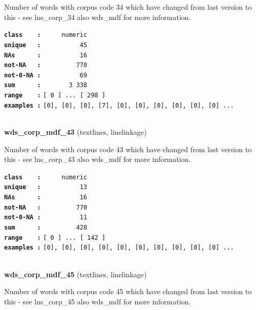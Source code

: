 \documentclass[]{article}
\begin{document}
Number of words with corpus code 34 which have changed from last version
to this - see lns\_corp\_34 also wds\_mdf for more information.

\textbf{\texttt{class\ \ \ \ :}} \texttt{~~~~~numeric}\\
\textbf{\texttt{unique\ \ \ :}} \texttt{~~~~~~~~~~45}\\
\textbf{\texttt{NAs\ \ \ \ \ \ :}} \texttt{~~~~~~~~~~16}\\
\textbf{\texttt{not-NA\ \ \ :}} \texttt{~~~~~~~~~770}\\
\textbf{\texttt{not-0-NA\ :}} \texttt{~~~~~~~~~~69}\\
\textbf{\texttt{sum\ \ \ \ \ \ :}} \texttt{~~~~~~~3~338}\\
\textbf{\texttt{range\ \ \ \ :}}
\texttt{{[}\ 0\ {]}\ ...\ {[}\ 298\ {]}}\\
\textbf{\texttt{examples\ :}}
\texttt{{[}0{]},\ {[}0{]},\ {[}0{]},\ {[}7{]},\ {[}0{]},\ {[}0{]},\ {[}0{]},\ {[}0{]},\ {[}0{]},\ {[}0{]}\ ...}\\

~

\textbf{wds\_corp\_mdf\_43} (textlines, linelinkage)

Number of words with corpus code 43 which have changed from last version
to this - see lns\_corp\_43 also wds\_mdf for more information.

\textbf{\texttt{class\ \ \ \ :}} \texttt{~~~~~numeric}\\
\textbf{\texttt{unique\ \ \ :}} \texttt{~~~~~~~~~~13}\\
\textbf{\texttt{NAs\ \ \ \ \ \ :}} \texttt{~~~~~~~~~~16}\\
\textbf{\texttt{not-NA\ \ \ :}} \texttt{~~~~~~~~~770}\\
\textbf{\texttt{not-0-NA\ :}} \texttt{~~~~~~~~~~11}\\
\textbf{\texttt{sum\ \ \ \ \ \ :}} \texttt{~~~~~~~~~428}\\
\textbf{\texttt{range\ \ \ \ :}}
\texttt{{[}\ 0\ {]}\ ...\ {[}\ 142\ {]}}\\
\textbf{\texttt{examples\ :}}
\texttt{{[}0{]},\ {[}0{]},\ {[}0{]},\ {[}0{]},\ {[}0{]},\ {[}0{]},\ {[}0{]},\ {[}0{]},\ {[}0{]},\ {[}0{]}\ ...}\\

~

\textbf{wds\_corp\_mdf\_45} (textlines, linelinkage)

Number of words with corpus code 45 which have changed from last version
to this - see lns\_corp\_45 also wds\_mdf for more information.
\end{document}
